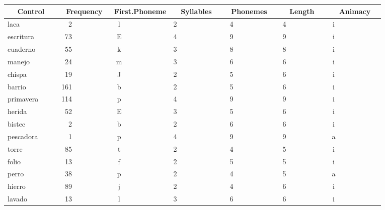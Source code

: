%
\setlongtables
\begin{longtable}{|l|c|c|c|c|c|c|}

\hline
\multicolumn{1}{|c|}{Control}&\multicolumn{1}{c|}{Frequency}&\multicolumn{1}{c|}{First.Phoneme}&\multicolumn{1}{c|}{Syllables}&\multicolumn{1}{c|}{Phonemes}&\multicolumn{1}{c|}{Length}&\multicolumn{1}{c|}{Animacy}\\ \hline
\endhead
\hline\endfoot
laca~~~~~~~~~&~~2~~~~~~~~~~&l~~~~~~~~~~~~&2~~~~~~~~~~~~&~4~~~~~~~~~~~&~4~~~~~~~~~~~&i~~~~~~~~~~~~\\ 
escritura~~~~&~73~~~~~~~~~~&E~~~~~~~~~~~~&4~~~~~~~~~~~~&~9~~~~~~~~~~~&~9~~~~~~~~~~~&i~~~~~~~~~~~~\\ 
cuaderno~~~~~&~55~~~~~~~~~~&k~~~~~~~~~~~~&3~~~~~~~~~~~~&~8~~~~~~~~~~~&~8~~~~~~~~~~~&i~~~~~~~~~~~~\\ 
manejo~~~~~~~&~24~~~~~~~~~~&m~~~~~~~~~~~~&3~~~~~~~~~~~~&~6~~~~~~~~~~~&~6~~~~~~~~~~~&i~~~~~~~~~~~~\\ 
chispa~~~~~~~&~19~~~~~~~~~~&J~~~~~~~~~~~~&2~~~~~~~~~~~~&~5~~~~~~~~~~~&~6~~~~~~~~~~~&i~~~~~~~~~~~~\\ 
barrio~~~~~~~&161~~~~~~~~~~&b~~~~~~~~~~~~&2~~~~~~~~~~~~&~5~~~~~~~~~~~&~6~~~~~~~~~~~&i~~~~~~~~~~~~\\ 
primavera~~~~&114~~~~~~~~~~&p~~~~~~~~~~~~&4~~~~~~~~~~~~&~9~~~~~~~~~~~&~9~~~~~~~~~~~&i~~~~~~~~~~~~\\ 
herida~~~~~~~&~52~~~~~~~~~~&E~~~~~~~~~~~~&3~~~~~~~~~~~~&~5~~~~~~~~~~~&~6~~~~~~~~~~~&i~~~~~~~~~~~~\\ 
bistec~~~~~~~&~~2~~~~~~~~~~&b~~~~~~~~~~~~&2~~~~~~~~~~~~&~6~~~~~~~~~~~&~6~~~~~~~~~~~&i~~~~~~~~~~~~\\ 
pescadora~~~~&~~1~~~~~~~~~~&p~~~~~~~~~~~~&4~~~~~~~~~~~~&~9~~~~~~~~~~~&~9~~~~~~~~~~~&a~~~~~~~~~~~~\\ 
torre~~~~~~~~&~85~~~~~~~~~~&t~~~~~~~~~~~~&2~~~~~~~~~~~~&~4~~~~~~~~~~~&~5~~~~~~~~~~~&i~~~~~~~~~~~~\\ 
folio~~~~~~~~&~13~~~~~~~~~~&f~~~~~~~~~~~~&2~~~~~~~~~~~~&~5~~~~~~~~~~~&~5~~~~~~~~~~~&i~~~~~~~~~~~~\\ 
perro~~~~~~~~&~38~~~~~~~~~~&p~~~~~~~~~~~~&2~~~~~~~~~~~~&~4~~~~~~~~~~~&~5~~~~~~~~~~~&a~~~~~~~~~~~~\\ 
hierro~~~~~~~&~89~~~~~~~~~~&j~~~~~~~~~~~~&2~~~~~~~~~~~~&~4~~~~~~~~~~~&~6~~~~~~~~~~~&i~~~~~~~~~~~~\\ 
lavado~~~~~~~&~13~~~~~~~~~~&l~~~~~~~~~~~~&3~~~~~~~~~~~~&~6~~~~~~~~~~~&~6~~~~~~~~~~~&i~~~~~~~~~~~~\\ 

\end{longtable}
